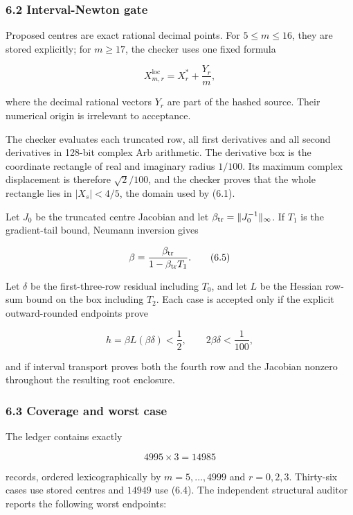 \documentclass[
  11pt,
  a4paper,
]{article}
\begin{document}
\subsubsection{6.2 Interval-Newton gate}\label{interval-newton-gate}

Proposed centres are exact rational decimal points. For \(5\le m\le16\),
they are stored explicitly; for \(m\ge17\), the checker uses one fixed
formula

\[
X_{m,r}^{\mathrm{loc}}=X_r^*+\frac{Y_r}{m},
\tag{6.4}
\]

where the decimal rational vectors \(Y_r\) are part of the hashed
source. Their numerical origin is irrelevant to acceptance.

The checker evaluates each truncated row, all first derivatives and all
second derivatives in 128-bit complex Arb arithmetic. The derivative box
is the coordinate rectangle of real and imaginary radius \(1/100\). Its
maximum complex displacement is therefore \(\sqrt2/100\), and the
checker proves that the whole rectangle lies in \(|X_s|<4/5\), the
domain used by (6.1).

Let \(J_0\) be the truncated centre Jacobian and let
\(\beta_{\rm tr}=\|J_0^{-1}\|_\infty\). If \(T_1\) is the gradient-tail
bound, Neumann inversion gives

\[
\beta=\frac{\beta_{\rm tr}}{1-\beta_{\rm tr}T_1}.
\tag{6.5}
\]

Let \(\delta\) be the first-three-row residual including \(T_0\), and
let \(L\) be the Hessian row-sum bound on the box including \(T_2\).
Each case is accepted only if the explicit outward-rounded endpoints
prove

\[
h=\beta L(\beta\delta)<\frac12,
\qquad
2\beta\delta<\frac1{100},
\tag{6.6}
\]

and if interval transport proves both the fourth row and the Jacobian
nonzero throughout the resulting root enclosure.

\subsubsection{6.3 Coverage and worst
case}\label{coverage-and-worst-case}

The ledger contains exactly

\[
4995\times3=14985
\]

records, ordered lexicographically by \(m=5,\ldots,4999\) and
\(r=0,2,3\). Thirty-six cases use stored centres and \(14949\) use
(6.4). The independent structural auditor reports the following worst
endpoints:
\end{document}
